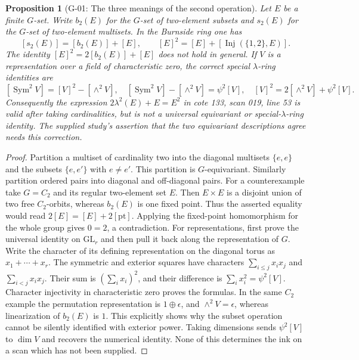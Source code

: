 \documentclass[11pt,a4paper]{article}
\newtheorem{proposition}{Proposition}
\theoremstyle{definition}\newtheorem{definition}{Definition}
\begin{document}
\begin{proposition}[G-01: The three meanings of the second operation]\label{G-01}
Let $E$ be a finite $G$-set. Write $b_2(E)$ for the $G$-set of two-element subsets and $s_2(E)$ for the $G$-set of two-element multisets. In the Burnside ring one has
\[
 [s_2(E)]=[b_2(E)]+[E],\qquad [E]^2=[E]+[\operatorname{Inj}(\{1,2\},E)].
\]
The identity $[E]^2=2[b_2(E)]+[E]$ does not hold in general. If $V$ is a representation over a field of characteristic zero, the correct special $\lambda$-ring identities are
\[
 [\operatorname{Sym}^2V]=[V]^2-[\wedge^2V],\quad
 [\operatorname{Sym}^2V]-[\wedge^2V]=\psi^2[V],\quad
 [V]^2=2[\wedge^2V]+\psi^2[V].
\]
Consequently the expression $2\lambda^2(E)+E=E^2$ in cote 133, scan 019, line 53 is valid after taking cardinalities, but is not a universal equivariant or special-$\lambda$-ring identity. The supplied study's assertion that the two equivariant descriptions agree needs this correction.
\end{proposition}
\begin{proof}
Partition a multiset of cardinality two into the diagonal multisets $\{e,e\}$ and the subsets $\{e,e'\}$ with $e\ne e'$. This partition is $G$-equivariant. Similarly partition ordered pairs into diagonal and off-diagonal pairs. For a counterexample take $G=C_2$ and its regular two-element set $E$. Then $E\times E$ is a disjoint union of two free $C_2$-orbits, whereas $b_2(E)$ is one fixed point. Thus the asserted equality would read $2[E]=[E]+2[\mathrm{pt}]$. Applying the fixed-point homomorphism for the whole group gives $0=2$, a contradiction.
For representations, first prove the universal identity on $\mathrm{GL}_r$ and then pull it back along the representation of $G$. Write the character of its defining representation on the diagonal torus as $x_1+\cdots+x_r$. The symmetric and exterior squares have characters $\sum_{i\leq j}x_ix_j$ and $\sum_{i<j}x_ix_j$. Their sum is $(\sum_i x_i)^2$, and their difference is $\sum_i x_i^2=\psi^2[V]$. Character injectivity in characteristic zero proves the formulas. In the same $C_2$ example the permutation representation is $1\oplus\epsilon$, and $\wedge^2V=\epsilon$, whereas linearization of $b_2(E)$ is $1$. This explicitly shows why the subset operation cannot be silently identified with exterior power. Taking dimensions sends $\psi^2[V]$ to $\dim V$ and recovers the numerical identity. None of this determines the ink on a scan which has not been supplied.
\end{proof}
\end{document}
